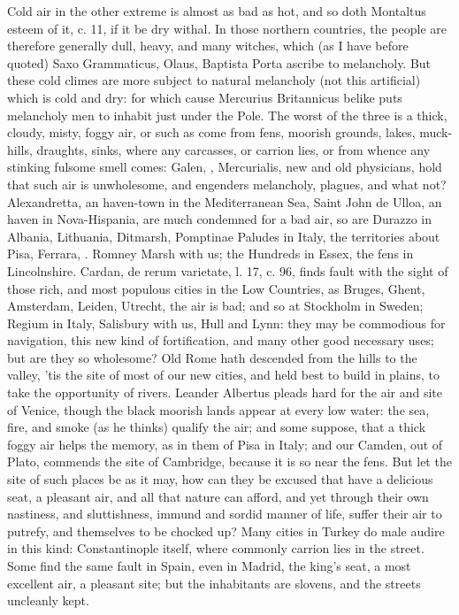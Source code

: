 {{Cold air in the other extreme is almost as bad as hot, and so doth
Montaltus esteem of it, c. 11, if it be dry withal. In those northern
countries, the people are therefore generally dull, heavy, and many
witches, which (as I have before quoted) Saxo Grammaticus, Olaus,
Baptista Porta ascribe to melancholy. But these cold climes are more
subject to natural melancholy (not this artificial) which is cold and
dry: for which cause Mercurius Britannicus belike puts melancholy
men to inhabit just under the Pole. The worst of the three is a
thick, cloudy, misty, foggy air, or such as come from fens,
moorish grounds, lakes, muck-hills, draughts, sinks, where any
carcasses, or carrion lies, or from whence any stinking fulsome smell
comes: Galen, \Avicenna{}, Mercurialis, new and old physicians, hold that
such air is unwholesome, and engenders melancholy, plagues, and what
not? Alexandretta, an haven-town in the Mediterranean Sea, Saint
John de Ulloa, an haven in Nova-Hispania, are much condemned for a bad
air, so are Durazzo in Albania, Lithuania, Ditmarsh, Pomptinae Paludes
in Italy, the territories about Pisa, Ferrara, \etc{}. Romney Marsh with
us; the Hundreds in Essex, the fens in Lincolnshire. Cardan, de rerum
varietate, l. 17, c. 96, finds fault with the sight of those rich, and
most populous cities in the Low Countries, as Bruges, Ghent, Amsterdam,
Leiden, Utrecht, \etc{} the air is bad; and so at Stockholm in Sweden;
Regium in Italy, Salisbury with us, Hull and Lynn: they may be
commodious for navigation, this new kind of fortification, and many
other good necessary uses; but are they so wholesome? Old Rome hath
descended from the hills to the valley, 'tis the site of most of our
new cities, and held best to build in plains, to take the opportunity
of rivers. Leander Albertus pleads hard for the air and site of Venice,
though the black moorish lands appear at every low water: the sea,
fire, and smoke (as he thinks) qualify the air; and some suppose,
that a thick foggy air helps the memory, as in them of Pisa in Italy;
and our Camden, out of Plato, commends the site of Cambridge, because
it is so near the fens. But let the site of such places be as it may,
how can they be excused that have a delicious seat, a pleasant air, and
all that nature can afford, and yet through their own nastiness, and
sluttishness, immund and sordid manner of life, suffer their air to
putrefy, and themselves to be chocked up? Many cities in Turkey do male
audire in this kind: Constantinople itself, where commonly carrion lies
in the street. Some find the same fault in Spain, even in Madrid, the
king's seat, a most excellent air, a pleasant site; but the inhabitants
are slovens, and the streets uncleanly kept.

}}
